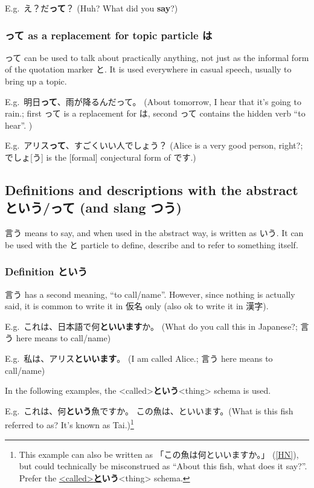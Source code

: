 \documentclass[../nihongo-gakushuu-kyouzai.tex]{subfiles}
\begin{document}
E.g.\ え？だ\textbf{って}？ (Huh? What did you \textbf{say}?)


\subsubsection{って as a replacement for topic particle は} \label{sec:tte-as-replacement-for-ha}

って can be used to talk about practically anything, not just as the informal form of the quotation marker と. It is used everywhere in casual speech, usually to bring up a topic.

E.g.\ 明日\textbf{って}、雨が降るんだって。 (About tomorrow, I hear that it's going to rain.; first って is a replacement for は, second って contains the hidden verb ``to hear''. )

E.g.\ アリス\textbf{って}、すごくいい人でしょう？ (Alice is a very good person, right?; でしょ[う] is the [formal] conjectural form of です.)


\subsection{Definitions and descriptions with the abstract という/って (and slang つう)} \label{sec:definitions-and-descriptions}

言う means to say, and when used in the abstract way, is written as いう. It can be used with the と particle to define, describe and to refer to something itself.


\subsubsection{Definition という} \label{sec:definition-toiu}
言う has a second meaning, ``to call/name''. However, since nothing is actually said, it is common to write it in 仮名 only (also ok to write it in 漢字).

E.g.\ これは、日本語で何\textbf{といいます}か。 (What do you call this in Japanese?; 言う here means to call/name)

E.g.\ 私は、アリス\textbf{といいます}。 (I am called Alice.; 言う here means to call/name)

In the following examples, the <called>\textbf{という}<thing> schema is used.

E.g.\ これは、何\textbf{という}魚ですか。 この魚は、といいます。(What is this fish referred to as? It's known as Tai.)\footnote{This example can also be written as 「この魚は何といいますか。」 (\href{https://ja.hinative.com/questions/16255453}{[HN]}), but could technically be misconstrued as ``About this fish, what does it say?''. Prefer the \ul{<called>\textbf{と}}\textbf{いう}<thing> schema.}
\end{document}
